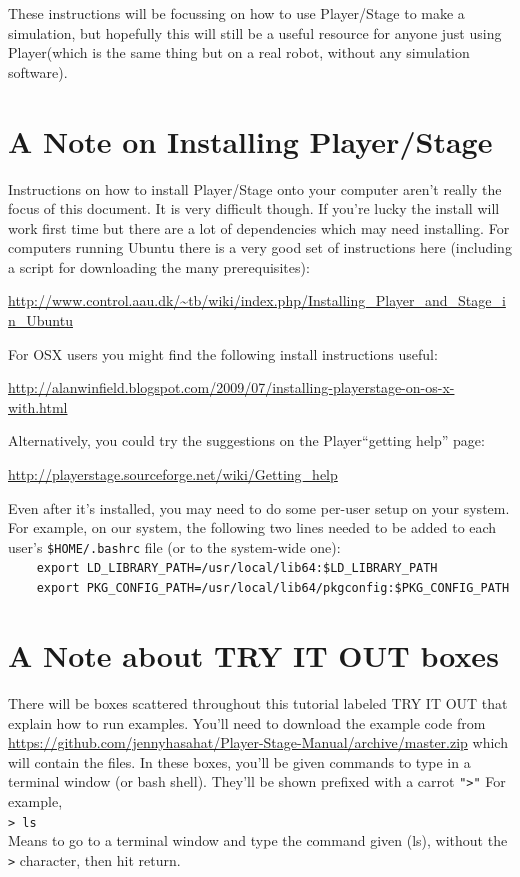 \documentclass[a4paper]{report}
\newcommand{\plst}{Player/Stage\xspace}
\newcommand{\pl}{Player\xspace}
\begin{document}
These instructions will be focussing on how to use \plst to make a simulation, but hopefully this will still be a useful resource for anyone just using \pl (which is the same thing but on a real robot, without any simulation software).

\section{A Note on Installing \plst}
Instructions on how to install \plst onto your computer aren't really the focus of this document. It is very difficult though. If you're lucky the install will work first time but there are a lot of dependencies which may need installing. For computers running Ubuntu there is a very good set of instructions here (including a script for downloading the many prerequisites):
\begin{center}
\url{http://www.control.aau.dk/~tb/wiki/index.php/Installing_Player_and_Stage_in_Ubuntu}
\end{center}
For OSX users you might find the following install instructions useful:
\begin{center}
\url{http://alanwinfield.blogspot.com/2009/07/installing-playerstage-on-os-x-with.html}
\end{center}
Alternatively, you could try the suggestions on the \pl ``getting help'' page:
\begin{center}
	\url{http://playerstage.sourceforge.net/wiki/Getting_help}
\end{center}

Even after it's installed, you may need to do some per-user setup on your
system.  For example, on our system, the following two lines needed to be
added to each user's {\tt \$HOME/.bashrc} file (or to the system-wide one): \\
{\tt ~~~~export LD\_LIBRARY\_PATH=/usr/local/lib64:\$LD\_LIBRARY\_PATH}\\
{\tt ~~~~export PKG\_CONFIG\_PATH=/usr/local/lib64/pkgconfig:\$PKG\_CONFIG\_PATH}

\section{A Note about TRY IT OUT boxes}
There will be boxes scattered throughout this tutorial labeled TRY IT OUT
that explain how to run examples. You'll need to download the example code
from \url{https://github.com/jennyhasahat/Player-Stage-Manual/archive/master.zip} which will contain the files. In these boxes, you'll be given commands to
type in a terminal
window (or bash shell). They'll be shown prefixed with a carrot {\tt ">"} For
example, \\
{\tt > ls } \\
Means to go to a terminal window and type the command given (ls), without
the {\tt >} character, then hit return.
\end{document}
